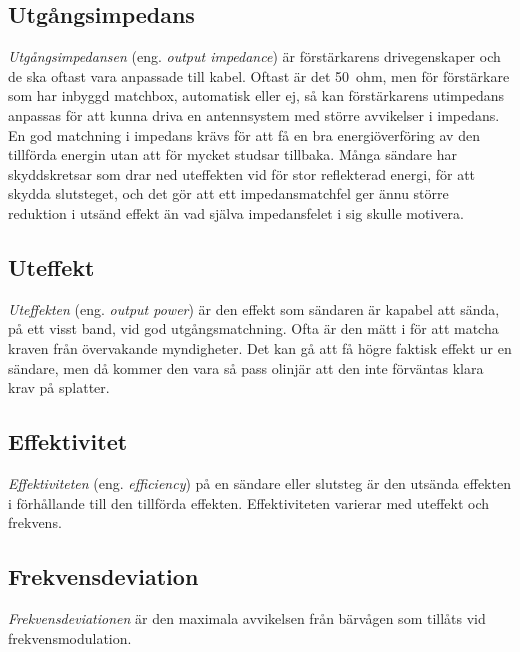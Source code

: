 \subsection{Utgångsimpedans}
\label{utgångsimpedans}

\emph{Utgångsimpedansen} (eng. \emph{output impedance}) är förstärkarens
drivegenskaper och de ska oftast vara anpassade till kabel.
Oftast är det 50~ohm, men för förstärkare som har inbyggd matchbox,
automatisk eller ej, så kan förstärkarens utimpedans anpassas
för att kunna driva en antennsystem med större avvikelser i impedans.
En god matchning i impedans krävs för att få en bra energiöverföring av den
tillförda energin utan att för mycket studsar tillbaka.
Många sändare har skyddskretsar som drar ned uteffekten vid för stor
reflekterad energi, för att skydda slutsteget, och det gör att ett
impedansmatchfel ger ännu större reduktion i utsänd effekt än vad själva
impedansfelet i sig skulle motivera.

\subsection{Uteffekt}

\emph{Uteffekten} (eng. \emph{output power}) är den effekt som sändaren är
kapabel att sända, på ett visst band, vid god utgångsmatchning.
Ofta är den mätt i \pep för att matcha kraven från övervakande myndigheter.
Det kan gå att få högre faktisk effekt ur en sändare, men då kommer den vara
så pass olinjär att den inte förväntas klara krav på splatter.

\subsection{Effektivitet}

\emph{Effektiviteten} (eng. \emph{efficiency}) på en sändare eller slutsteg
är den utsända effekten i förhållande till den tillförda effekten.
Effektiviteten varierar med uteffekt och frekvens.

\subsection{Frekvensdeviation}

\emph{Frekvensdeviationen} är den maximala avvikelsen från bärvågen som
tillåts vid frekvensmodulation.


